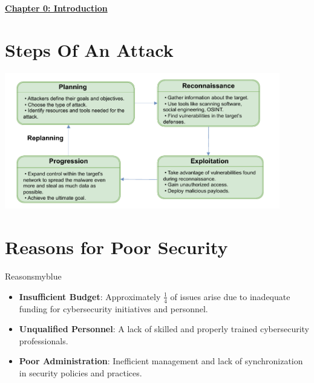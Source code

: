 \begin{center}
    \Huge{\textbf{\underline{Chapter 0: Introduction}}}
\end{center}

\setcounter{section}{0}

\vspace{0.35cm}

\section{Steps Of An Attack}

\vspace{0.25cm}
\begin{center}
    \includegraphics[width=0.9\textwidth]{Chapters/Diagram/Introduction/attack.drawio.pdf}
\end{center}

\vspace{0.35cm}
\section{Reasons for Poor Security}
\begin{prettyBox}{Reasons}{myblue}
\begin{itemize}
    \item \textbf{Insufficient Budget}: Approximately \(\frac{1}{4}\) of issues arise due to inadequate funding for cybersecurity initiatives and personnel.
    \item \textbf{Unqualified Personnel}: A lack of skilled and properly trained cybersecurity professionals.
    \item \textbf{Poor Administration}: Inefficient management and lack of synchronization in security policies and practices.
\end{itemize}
\end{prettyBox}

\vspace{0.35cm}

